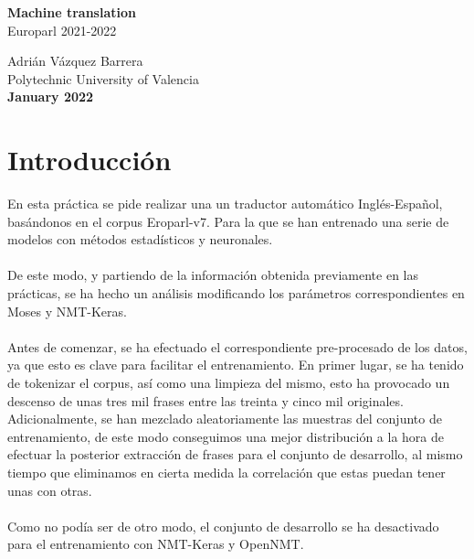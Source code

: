 \documentclass[12pt]{article}
\begin{document}
\begin{titlepage}
    \begin{center}
        \vspace*{1cm}
         \textbf{\huge Machine translation} \\        
        \vspace{0.25cm}
         {\LARGE Europarl 2021-2022 }\\
 
        \vfill
        
        

        Adrián Vázquez Barrera \\
        \vspace{0.25cm}
        Polytechnic University of Valencia\\
        \vspace{0.25cm}
        \textbf{January 2022}
             
    \end{center}
 \end{titlepage}

\newpage

\section*{Introducción}

En esta práctica se pide realizar una un traductor automático Inglés-Español, basándonos en el corpus Eroparl-v7. Para la que se han entrenado una serie de modelos con métodos estadísticos y neuronales.
\\\\
De este modo, y partiendo de la información obtenida previamente en las prácticas, se ha hecho un análisis modificando los parámetros correspondientes en Moses y NMT-Keras.
\\\\
Antes de comenzar, se ha efectuado el correspondiente pre-procesado de los datos, ya que esto es clave para facilitar el entrenamiento. En primer lugar, se ha tenido de tokenizar el corpus, así como una limpieza del mismo, esto ha provocado un descenso de unas tres mil frases entre las treinta y cinco mil originales. Adicionalmente, se han mezclado aleatoriamente las muestras del conjunto de entrenamiento, de este modo conseguimos una mejor distribución a la hora de efectuar la posterior extracción de frases para el conjunto de desarrollo, al mismo tiempo que eliminamos en cierta medida la correlación que estas puedan tener unas con otras.
\\\\
Como no podía ser de otro modo, el conjunto de desarrollo se ha desactivado para el entrenamiento con NMT-Keras y OpenNMT.
\newpage
\end{document}
